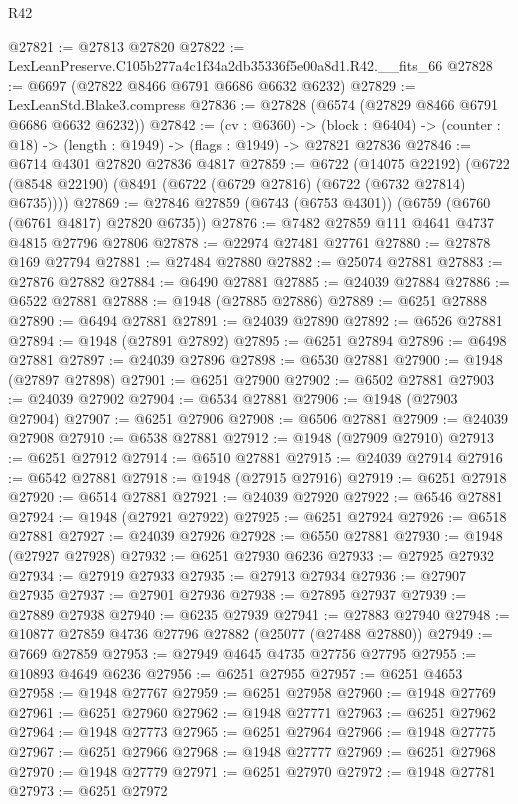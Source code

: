 \begin{lexlean}{R42}
\begin{coremodule}
{@27821 := @27813 @27820
@27822 := LexLeanPreserve.C105b277a4c1f34a2db35336f5e00a8d1.R42.__fits_66
@27828 := @6697 (@27822 @8466 @6791 @6686 @6632 @6232)
@27829 := LexLeanStd.Blake3.compress
@27836 := @27828 (@6574 (@27829 @8466 @6791 @6686 @6632 @6232))
@27842 := (cv : @6360) ->
  (block : @6404) -> (counter : @18) -> (length : @1949) -> (flags : @1949) -> @27821 @27836
@27846 := @6714 @4301 @27820 @27836 @4817
@27859 := @6722
    (@14075 @22192)
    (@6722 (@8548 @22190) (@8491 (@6722 (@6729 @27816) (@6722 (@6732 @27814) @6735))))
@27869 := @27846 @27859 (@6743 (@6753 @4301)) (@6759 (@6760 (@6761 @4817) @27820 @6735))
@27876 := @7482 @27859 @111 @4641 @4737 @4815 @27796 @27806
@27878 := @22974 @27481 @27761
@27880 := @27878 @169 @27794
@27881 := @27484 @27880
@27882 := @25074 @27881
@27883 := @27876 @27882
@27884 := @6490 @27881
@27885 := @24039 @27884
@27886 := @6522 @27881
@27888 := @1948 (@27885 @27886)
@27889 := @6251 @27888
@27890 := @6494 @27881
@27891 := @24039 @27890
@27892 := @6526 @27881
@27894 := @1948 (@27891 @27892)
@27895 := @6251 @27894
@27896 := @6498 @27881
@27897 := @24039 @27896
@27898 := @6530 @27881
@27900 := @1948 (@27897 @27898)
@27901 := @6251 @27900
@27902 := @6502 @27881
@27903 := @24039 @27902
@27904 := @6534 @27881
@27906 := @1948 (@27903 @27904)
@27907 := @6251 @27906
@27908 := @6506 @27881
@27909 := @24039 @27908
@27910 := @6538 @27881
@27912 := @1948 (@27909 @27910)
@27913 := @6251 @27912
@27914 := @6510 @27881
@27915 := @24039 @27914
@27916 := @6542 @27881
@27918 := @1948 (@27915 @27916)
@27919 := @6251 @27918
@27920 := @6514 @27881
@27921 := @24039 @27920
@27922 := @6546 @27881
@27924 := @1948 (@27921 @27922)
@27925 := @6251 @27924
@27926 := @6518 @27881
@27927 := @24039 @27926
@27928 := @6550 @27881
@27930 := @1948 (@27927 @27928)
@27932 := @6251 @27930 @6236
@27933 := @27925 @27932
@27934 := @27919 @27933
@27935 := @27913 @27934
@27936 := @27907 @27935
@27937 := @27901 @27936
@27938 := @27895 @27937
@27939 := @27889 @27938
@27940 := @6235 @27939
@27941 := @27883 @27940
@27948 := @10877 @27859 @4736 @27796 @27882 (@25077 (@27488 @27880))
@27949 := @7669 @27859
@27953 := @27949 @4645 @4735 @27756 @27795
@27955 := @10893 @4649 @6236
@27956 := @6251 @27955
@27957 := @6251 @4653
@27958 := @1948 @27767
@27959 := @6251 @27958
@27960 := @1948 @27769
@27961 := @6251 @27960
@27962 := @1948 @27771
@27963 := @6251 @27962
@27964 := @1948 @27773
@27965 := @6251 @27964
@27966 := @1948 @27775
@27967 := @6251 @27966
@27968 := @1948 @27777
@27969 := @6251 @27968
@27970 := @1948 @27779
@27971 := @6251 @27970
@27972 := @1948 @27781
@27973 := @6251 @27972
}
\end{coremodule}
\end{lexlean}
